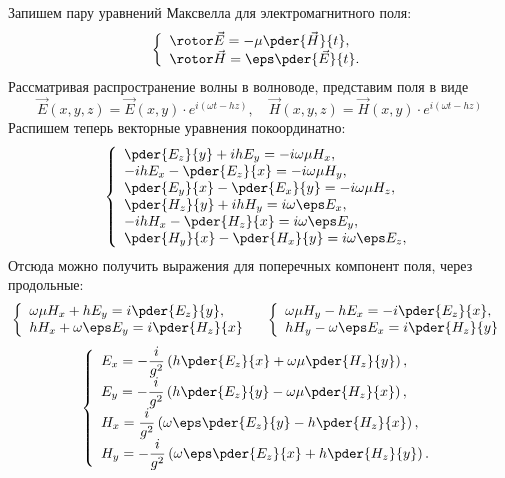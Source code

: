     Запишем пару уравнений Максвелла для электромагнитного поля:
    \[
        \left\{
        \begin{array}{l}
            \rotor\vec{E} = -\mu\pder{\vec{H}}{t},\\
            \rotor\vec{H} = \eps\pder{\vec{E}}{t}.
        \end{array}
        \right.
    \]
    Рассматривая распространение волны в волноводе, представим поля в виде
    \[
        \vec{E}(x,y,z) = \vec{E}(x,y) \cdot e^{i(\omega t - hz)},\quad
        \vec{H}(x,y,z) = \vec{H}(x,y) \cdot e^{i(\omega t - hz)}
    \]
    Распишем теперь векторные уравнения покоординатно:
    \[
        \left\{
            \begin{array}{l}
                \pder{E_z}{y} + ihE_y = -i\omega\mu H_x,\\
                -ihE_x - \pder{E_z}{x} = -i\omega\mu H_y,\\
                \pder{E_y}{x} - \pder{E_x}{y} = -i\omega\mu H_z,\\
                \pder{H_z}{y} + ihH_y = i\omega\eps E_x,\\
                -ihH_x - \pder{H_z}{x} = i\omega\eps E_y,\\
                \pder{H_y}{x} - \pder{H_x}{y} = i\omega\eps E_z,\\
            \end{array}
        \right.
    \]
    Отсюда можно получить выражения для поперечных компонент поля, через
    продольные:
    \[
        \left\{
        \begin{array}{l}
            \omega\mu H_x + h E_y = i\pder{E_z}{y},\\
            h H_x + \omega\eps E_y = i\pder{H_z}{x}
        \end{array}
        \right.
        \quad
        \left\{
        \begin{array}{l}
            \omega\mu H_y - h E_x = -i\pder{E_z}{x},\\
            h H_y - \omega\eps E_x = i\pder{H_z}{y}
        \end{array}
        \right.
    \]
    \[
        \left\{
        \begin{array}{l}
            E_x = -\frac{i}{g^2}\left( h\pder{E_z}{x} +
            \omega\mu\pder{H_z}{y} \right),\\
            E_y = -\frac{i}{g^2}\left( h\pder{E_z}{y} -
            \omega\mu\pder{H_z}{x} \right),\\
            H_x = \frac{i}{g^2}\left(
            \omega\eps\pder{E_z}{y} - h \pder{H_z}{x} \right),\\
            H_y = -\frac{i}{g^2}\left(
            \omega\eps\pder{E_z}{x} + h \pder{H_z}{y} \right).
        \end{array}
        \right.
    \]
